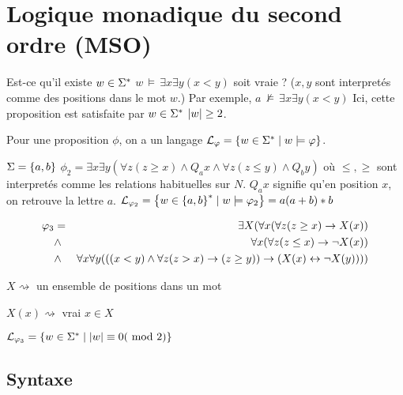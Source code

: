 \section{Logique monadique du second ordre (MSO)}

Est-ce qu'il existe $w \in \Sigma^{*}$ \tq $w \, \models \, \exists x \exists y (x < y)$ soit vraie ?
($x,y$ sont interpretés comme des positions dans le mot $w$.)
Par exemple, $a \, \nvDash \, \exists x \exists y (x < y)$
Ici, cette proposition est satisfaite par $w \in \Sigma^{*}$ \ssi $\left|w\right| \geq 2$.


Pour une proposition $\phi$, on a un langage $\mathcal{L}_\varphi = \left\{w \in \Sigma^{*} \mid w \models \varphi\right\}$.


\begin{exemple}
	$\Sigma = \left\{a,b\right\}$
	$\phi_2 = \exists x \exists y (\forall z (z \geq x) \land Q_a x \land \forall z (z \leq y) \land Q_b y)$
	où $\leq, \geq$ sont interpretés comme les relations habituelles sur $N$.
	$Q_a x$ signifie qu'en position $x$, on retrouve la lettre $a$.
	$\mathcal{L}_{\varphi_2} = \left\{w \in \left\{a,b\right\}^{*} \mid w \models \varphi_2\right\} = a(a+b)*b$
\end{exemple}


\begin{exemple} \label{example:phi3}

	\begin{eqnarray*}
		\varphi_3 &=& \exists X ( \forall x (\forall z (z \geq x) \rightarrow X(x)) \\
		&\land& \forall x (\forall z (z \leq x) \rightarrow \lnot X(x)) \\
		&\land& \forall x \forall y (((x < y) \land \forall z(z > x) \rightarrow (z \geq y)) \rightarrow (X (x) \leftrightarrow \lnot X(y))))
	\end{eqnarray*}



	$X \rightsquigarrow $ un ensemble de positions dans un mot


	$X (x)\rightsquigarrow$ vrai \ssi $x \in X$


	$\mathcal{L}_{\varphi_3} = \left\{w \in \Sigma^{*} \mid \left|w\right| \equiv 0 (\text { mod } 2)\right\}$
\end{exemple}

\subsection{Syntaxe}


